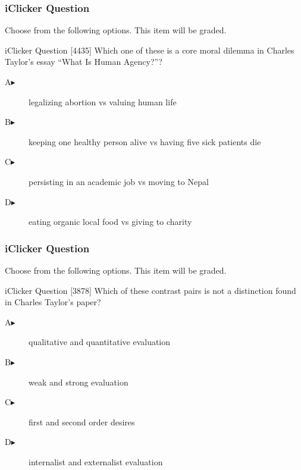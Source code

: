 \documentclass[xcolor=dvipsnames]{beamer}
\begin{document}
\begin{frame}
  \frametitle{iClicker Question}
Choose from the following options. This item will be graded.
\begin{block}{iClicker Question}
[4435] Which one of these is a core moral dilemma in Charles Taylor's essay
``What Is Human Agency?''?
\end{block}
\begin{description}
\item[A\hspace{.2in}$\blacktriangleright$] legalizing abortion vs valuing human life
\item[B\hspace{.2in}$\blacktriangleright$] keeping one healthy person alive vs having five sick patients die
\item[C\hspace{.2in}$\blacktriangleright$] persisting in an academic job vs moving to Nepal
\item[D\hspace{.2in}$\blacktriangleright$] eating organic local food vs giving to charity
\end{description}
\end{frame}

\begin{frame}
  \frametitle{iClicker Question}
Choose from the following options. This item will be graded.
\begin{block}{iClicker Question}
[3878] Which of these contrast pairs is not a distinction found in Charles
Taylor's paper?
\end{block}
\begin{description}
\item[A\hspace{.2in}$\blacktriangleright$] qualitative and quantitative evaluation
\item[B\hspace{.2in}$\blacktriangleright$] weak and strong evaluation
\item[C\hspace{.2in}$\blacktriangleright$] first and second order desires
\item[D\hspace{.2in}$\blacktriangleright$] internalist and externalist evaluation
\end{description}
\end{frame}
\end{document}
